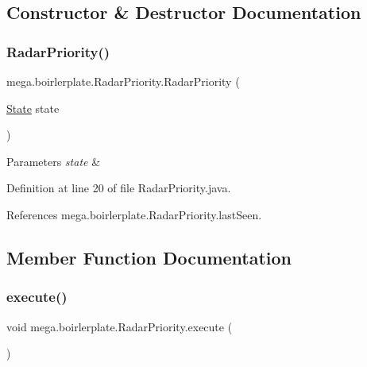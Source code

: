 \subsection{Constructor \& Destructor Documentation}
\mbox{\label{classmega_1_1boirlerplate_1_1_radar_priority_ad73faa5f90ef3960fe220047448da9a2}} 
\subsubsection{\texorpdfstring{Radar\+Priority()}{RadarPriority()}}
{\footnotesize\ttfamily mega.\+boirlerplate.\+Radar\+Priority.\+Radar\+Priority (\begin{DoxyParamCaption}\item[{\hyperlink{classmega_1_1boirlerplate_1_1_state}{State}}]{state }\end{DoxyParamCaption})}


\begin{DoxyParams}{Parameters}
{\em state} & \\
\hline
\end{DoxyParams}


Definition at line 20 of file Radar\+Priority.\+java.



References mega.\+boirlerplate.\+Radar\+Priority.\+last\+Seen.



\subsection{Member Function Documentation}
\mbox{\label{classmega_1_1boirlerplate_1_1_radar_priority_a7a90d23b88758a08734ae7af560f48bd}} 
\subsubsection{\texorpdfstring{execute()}{execute()}}
{\footnotesize\ttfamily void mega.\+boirlerplate.\+Radar\+Priority.\+execute (\begin{DoxyParamCaption}{ }\end{DoxyParamCaption})}



